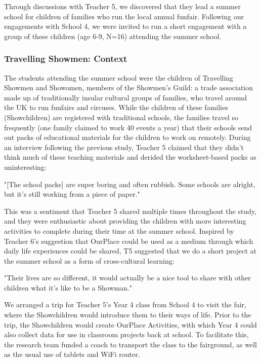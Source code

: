 Through discussions with Teacher 5, we discovered that they lead a summer school for children of families who run the local annual funfair. Following our engagements with School 4, we were invited to run a short engagement with a group of these children (age 6-9, N=16) attending the summer school.

\subsubsection{Travelling Showmen: Context}
The students attending the summer school were the children of Travelling Showmen and Showomen, members of the Showmen's Guild: a trade association made up of traditionally insular cultural groups of families, who travel around the UK to run funfairs and circuses. While the children of these families (Showchildren) are registered with traditional schools, the families travel so frequently (one family claimed to work 40 events a year) that their schools send out packs of educational materials for the children to work on remotely. During an interview following the previous study, Teacher 5 claimed that they didn't think much of these teaching materials and derided the worksheet-based packs as uninteresting: 

\begin{displayquote}
"[The school packs] are super boring and often rubbish. Some schools are alright, but it's still working from a piece of paper."
\end{displayquote}

This was a sentiment that Teacher 5 shared multiple times throughout the study, and they were enthusiastic about providing the children with more interesting activities to complete during their time at the summer school. Inspired by Teacher 6's suggestion that OurPlace could be used as a medium through which daily life experiences could be shared, T5 suggested that we do a short project at the summer school as a form of cross-cultural learning: 

\begin{displayquote}
"Their lives are so different, it would actually be a nice tool to share with other children what it's like to be a Showman."
\end{displayquote}

We arranged a trip for Teacher 5's Year 4 class from School 4 to visit the fair, where the Showchildren would introduce them to their ways of life. Prior to the trip, the Showchildren would create OurPlace Activities, with which Year 4 could also collect data for use in classroom projects back at school. To facilitate this, the research team funded a coach to transport the class to the fairground, as well as the usual use of tablets and WiFi router.


